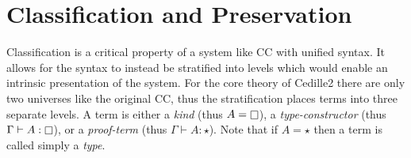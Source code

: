 \section{Classification and Preservation}

Classification is a critical property of a system like CC with unified syntax.
It allows for the syntax to instead be stratified into levels which would enable an intrinsic presentation of the system.
For the core theory of Cedille2 there are only two universes like the original CC, thus the stratification places terms into three separate levels.
A term is either a \textit{kind} (thus $A = \kind$), a \textit{type-constructor} (thus $\Gamma \vdash A : \kind$), or a \textit{proof-term} (thus $\Gamma \vdash A : \star$).
Note that if $A = \star$ then a term is called simply a \textit{type}.

